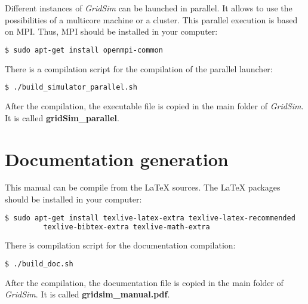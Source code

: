 Different instances of {\it GridSim} can be launched in parallel.
It allows to use the possibilities of a multicore machine or a cluster.
This parallel execution is based on MPI.
Thus, MPI should be installed in your computer:
\begin{lstlisting}[language=bash]
  $ sudo apt-get install openmpi-common
\end{lstlisting}

There is a compilation script for the compilation of the parallel launcher:
\begin{lstlisting}[language=bash]
  $ ./build_simulator_parallel.sh
\end{lstlisting}
\noindent
After the compilation, the executable file is copied in the main folder of {\it GridSim}.
It is called {\bf gridSim\_parallel}.

%
\section{Documentation generation}

This manual can be compile from the {\LaTeX} sources.
The {\LaTeX} packages should be installed in your computer:
\begin{lstlisting}[language=bash]
  $ sudo apt-get install texlive-latex-extra texlive-latex-recommended
		 texlive-bibtex-extra texlive-math-extra 
\end{lstlisting}

There is compilation script for the documentation compilation:
\begin{lstlisting}[language=bash]
  $ ./build_doc.sh
\end{lstlisting}
\noindent
After the compilation, the documentation file is copied in the main folder of {\it GridSim}.
It is called {\bf gridsim\_manual.pdf}.


